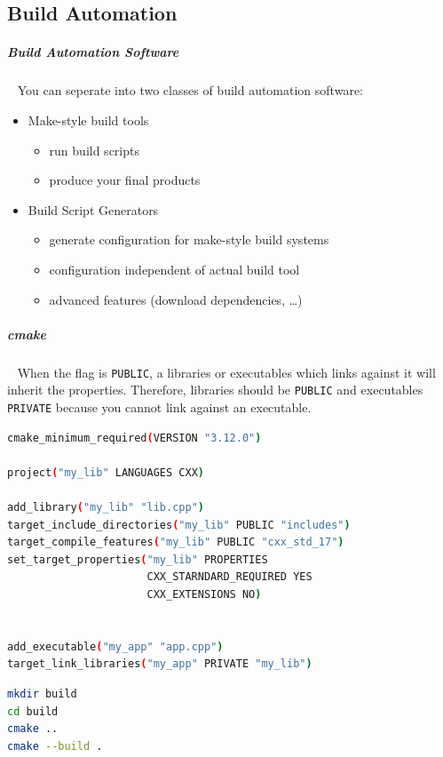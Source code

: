 \documentclass[11pt,twoside,landscape]{article}
\begin{document}
\begin{multicols}{2}
\section{Build Automation}
\label{sec:org97de5a8}
\subparagraph{Build Automation Software} \
\label{sec:org1cad2dc}
You can seperate into two classes of build automation software:
\begin{itemize}
\item Make-style build tools
\begin{itemize}
\item run build scripts
\item produce your final products
\end{itemize}
\item Build Script Generators
\begin{itemize}
\item generate configuration for make-style build systems
\item configuration independent of actual build tool
\item advanced features (download dependencies, \ldots{})
\end{itemize}
\end{itemize}


\subparagraph{cmake} \
\label{sec:org1e92279}
When the flag is \texttt{PUBLIC}, a libraries or executables which links against it will inherit the properties.
Therefore, libraries should be \texttt{PUBLIC} and executables \texttt{PRIVATE} because you cannot link against an executable.


\begin{lstlisting}[language=sh,label=lst:org4d49bae,caption={Example for CMakeLists.txt},captionpos=b,numbers=none]
cmake_minimum_required(VERSION "3.12.0")

project("my_lib" LANGUAGES CXX)

add_library("my_lib" "lib.cpp")
target_include_directories("my_lib" PUBLIC "includes")
target_compile_features("my_lib" PUBLIC "cxx_std_17")
set_target_properties("my_lib" PROPERTIES
                      CXX_STARNDARD_REQUIRED YES
                      CXX_EXTENSIONS NO)


add_executable("my_app" "app.cpp")
target_link_libraries("my_app" PRIVATE "my_lib")
\end{lstlisting}

\begin{lstlisting}[language=sh,label=lst:orgd7067bc,caption={Build cmake project},captionpos=b,numbers=none]
mkdir build
cd build
cmake ..
cmake --build .
\end{lstlisting}


\end{multicols}
\end{document}
